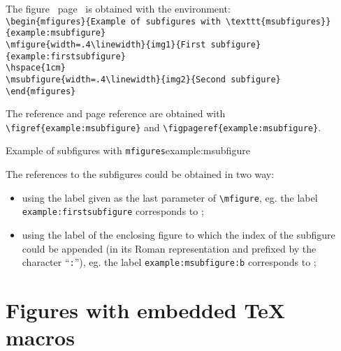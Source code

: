 \documentclass[book,taskpackage,specpackage,codepackage]{upmethodology-document}
\begin{document}
The figure~ page~ is obtained with the environment:\\
\texttt{{\textbackslash}begin\{mfigures\}\{Example of subfigures with {\textbackslash}texttt\{msubfigures\}\}\{example:msubfigure\}}\\
\texttt{{\textbackslash}mfigure\{width=.4{\textbackslash}linewidth\}\{img1\}\{First subfigure\}\{example:firstsubfigure\}} \\
\texttt{{\textbackslash}hspace\{1cm\}} \\
\texttt{{\textbackslash}msubfigure\{width=.4{\textbackslash}linewidth\}\{img2\}\{Second subfigure\}} \\
\texttt{{\textbackslash}end\{mfigures\}}

The reference and page reference are obtained with \texttt{{\textbackslash}figref\{example:msubfigure\}} and \texttt{{\textbackslash}figpageref\{example:msubfigure\}}.

\begin{mfigures}{Example of subfigures with \texttt{mfigures}}{example:msubfigure}
	\hspace{1cm}
\end{mfigures}

The references to the subfigures could be obtained in two way:\nopagebreak\begin{itemize}
\item using the label given as the last parameter of \texttt{{\textbackslash}mfigure}, eg. the label \texttt{example:firstsubfigure} corresponds to ;
\item using the label of the enclosing figure to which the index of the subfigure could be appended (in its Roman representation and prefixed by the character ``\texttt{:}''), eg. the label \texttt{example:msubfigure:b} corresponds to ;
\end{itemize}

\section{Figures with embedded \TeX\xspace macros}
\end{document}
